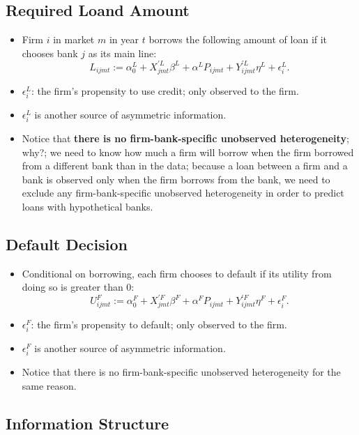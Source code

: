 \documentclass[
]{book}
\providecommand{\tightlist}{%
  \setlength{\itemsep}{0pt}\setlength{\parskip}{0pt}}
\begin{document}
\hypertarget{required-loand-amount}{%
\subsection{Required Loand Amount}\label{required-loand-amount}}

\begin{itemize}
\tightlist
\item
  Firm \(i\) in market \(m\) in year \(t\) borrows the following amount of loan if it chooses bank \(j\) as its main line:
  \[
  L_{ijmt} := \alpha_0^L + X_{jmt}^{\prime L} \beta^L + \alpha^L P_{ijmt} + Y_{ijmt}^{\prime L} \eta^L + \epsilon_i^L.
  \]
\item
  \(\epsilon_i^L\): the firm's propensity to use credit; only observed to the firm.
\item
  \(\epsilon_i^L\) is another source of asymmetric information.
\item
  Notice that \textbf{there is no firm-bank-specific unobserved heterogeneity}; why?; we need to know how much a firm will borrow when the firm borrowed from a different bank than in the data; because a loan between a firm and a bank is observed only when the firm borrows from the bank, we need to exclude any firm-bank-specific unobserved heterogeneity in order to predict loans with hypothetical banks.
\end{itemize}

\hypertarget{default-decision}{%
\subsection{Default Decision}\label{default-decision}}

\begin{itemize}
\tightlist
\item
  Conditional on borrowing, each firm chooses to default if its utility from doing so is greater than 0:
  \[
  U_{ijmt}^F := \alpha_0^F + X_{jmt}^{\prime F} \beta^F + \alpha^F P_{ijmt} + Y_{ijmt}^{\prime F} \eta^F + \epsilon_i^F.
  \]
\item
  \(\epsilon_i^F\): the firm's propensity to default; only observed to the firm.
\item
  \(\epsilon_i^F\) is another source of asymmetric information.
\item
  Notice that there is no firm-bank-specific unobserved heterogeneity for the same reason.
\end{itemize}

\hypertarget{information-structure}{%
\subsection{Information Structure}\label{information-structure}}
\end{document}
